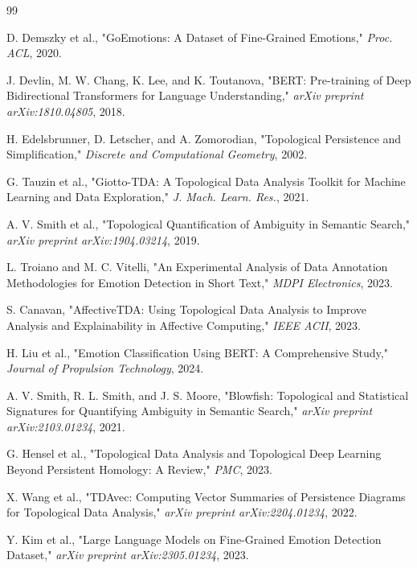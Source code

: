 \begin{thebibliography}{99}

D. Demszky et al., "GoEmotions: A Dataset of Fine-Grained Emotions," \textit{Proc. ACL}, 2020.

J. Devlin, M. W. Chang, K. Lee, and K. Toutanova, "BERT: Pre-training of Deep Bidirectional Transformers for Language Understanding," \textit{arXiv preprint arXiv:1810.04805}, 2018.

H. Edelsbrunner, D. Letscher, and A. Zomorodian, "Topological Persistence and Simplification," \textit{Discrete and Computational Geometry}, 2002.

G. Tauzin et al., "Giotto-TDA: A Topological Data Analysis Toolkit for Machine Learning and Data Exploration," \textit{J. Mach. Learn. Res.}, 2021.

A. V. Smith et al., "Topological Quantification of Ambiguity in Semantic Search," \textit{arXiv preprint arXiv:1904.03214}, 2019.

L. Troiano and M. C. Vitelli, "An Experimental Analysis of Data Annotation Methodologies for Emotion Detection in Short Text," \textit{MDPI Electronics}, 2023.

S. Canavan, "AffectiveTDA: Using Topological Data Analysis to Improve Analysis and Explainability in Affective Computing," \textit{IEEE ACII}, 2023.

H. Liu et al., "Emotion Classification Using BERT: A Comprehensive Study," \textit{Journal of Propulsion Technology}, 2024.

A. V. Smith, R. L. Smith, and J. S. Moore, "Blowfish: Topological and Statistical Signatures for Quantifying Ambiguity in Semantic Search," \textit{arXiv preprint arXiv:2103.01234}, 2021.

G. Hensel et al., "Topological Data Analysis and Topological Deep Learning Beyond Persistent Homology: A Review," \textit{PMC}, 2023.

X. Wang et al., "TDAvec: Computing Vector Summaries of Persistence Diagrams for Topological Data Analysis," \textit{arXiv preprint arXiv:2204.01234}, 2022.

Y. Kim et al., "Large Language Models on Fine-Grained Emotion Detection Dataset," \textit{arXiv preprint arXiv:2305.01234}, 2023.


\end{thebibliography}
